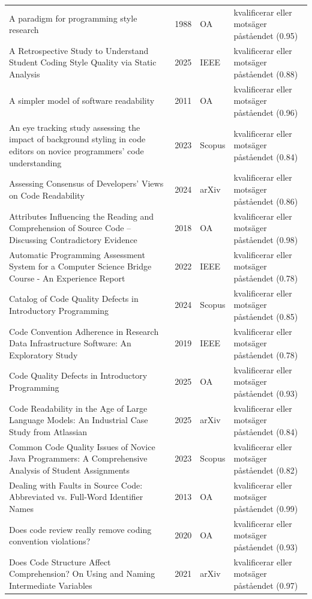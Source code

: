 \begin{longtable}{@{}%
  >{\raggedright\arraybackslash}p{}c%
  >{\raggedright\arraybackslash}p{}%
  >{\raggedright\arraybackslash}p{}@{}}
A paradigm for programming style research & 1988 & OA & kvalificerar eller motsäger påståendet (0.95) \\
A Retrospective Study to Understand Student Coding Style Quality via Static Analysis & 2025 & IEEE & kvalificerar eller motsäger påståendet (0.88) \\
A simpler model of software readability & 2011 & OA & kvalificerar eller motsäger påståendet (0.96) \\
An eye tracking study assessing the impact of background styling in code editors on novice programmers' code understanding & 2023 & Scopus & kvalificerar eller motsäger påståendet (0.84) \\
Assessing Consensus of Developers' Views on Code Readability & 2024 & arXiv & kvalificerar eller motsäger påståendet (0.86) \\
Attributes Influencing the Reading and Comprehension of Source Code -- Discussing Contradictory Evidence & 2018 & OA & kvalificerar eller motsäger påståendet (0.98) \\
Automatic Programming Assessment System for a Computer Science Bridge Course - An Experience Report & 2022 & IEEE & kvalificerar eller motsäger påståendet (0.78) \\
Catalog of Code Quality Defects in Introductory Programming & 2024 & Scopus & kvalificerar eller motsäger påståendet (0.85) \\
Code Convention Adherence in Research Data Infrastructure Software: An Exploratory Study & 2019 & IEEE & kvalificerar eller motsäger påståendet (0.78) \\
Code Quality Defects in Introductory Programming & 2025 & OA & kvalificerar eller motsäger påståendet (0.93) \\
Code Readability in the Age of Large Language Models: An Industrial Case Study from Atlassian & 2025 & arXiv & kvalificerar eller motsäger påståendet (0.84) \\
Common Code Quality Issues of Novice Java Programmers: A Comprehensive Analysis of Student Assignments & 2023 & Scopus & kvalificerar eller motsäger påståendet (0.82) \\
Dealing with Faults in Source Code: Abbreviated vs. Full-Word Identifier Names & 2013 & OA & kvalificerar eller motsäger påståendet (0.99) \\
Does code review really remove coding convention violations? & 2020 & OA & kvalificerar eller motsäger påståendet (0.93) \\
Does Code Structure Affect Comprehension? On Using and Naming Intermediate Variables & 2021 & arXiv & kvalificerar eller motsäger påståendet (0.97) \\

\end{longtable}
